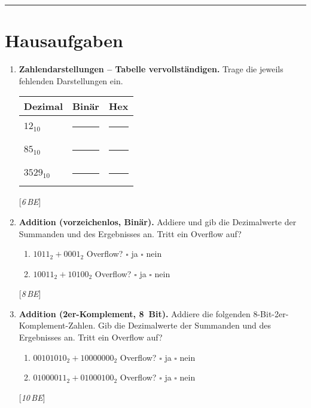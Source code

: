 \documentclass[11pt,a4paper]{scrartcl}
\newenvironment{aufgaben}{%
	\begin{enumerate}[leftmargin=*,label=\textbf{Aufgabe~\arabic*:}, itemsep=0.6em]
	}{\end{enumerate}}
\newcommand{\punkte}[1]{\hfill{\small[\textit{#1\,BE}]}}
\begin{document}
	\vspace{0.3em}
	\hrule
	\vspace{0.6em}
	
	\section*{Hausaufgaben}
	
	\begin{aufgaben}
		\item \textbf{Zahlendarstellungen – Tabelle vervollständigen.} Trage die jeweils fehlenden Darstellungen ein.
		\vspace{0.3em}
		
		\renewcommand{\arraystretch}{1.2}
		\begin{tabularx}{\linewidth}{|>{\raggedright\arraybackslash}X|>{\raggedright\arraybackslash}X|>{\raggedright\arraybackslash}X|}
			\hline
			\textbf{Dezimal} & \textbf{Binär} & \textbf{Hex} \\ \hline
			\(12_{10}\)  & \rule{4.5cm}{0.4pt} & \rule{3.0cm}{0.4pt} \\ \hline
			\(85_{10}\)  & \rule{4.5cm}{0.4pt} & \rule{3.0cm}{0.4pt} \\ \hline
			\(3529_{10}\)& \rule{4.5cm}{0.4pt} & \rule{3.0cm}{0.4pt} \\ \hline
		\end{tabularx}
		\punkte{6}
		
		\item \textbf{Addition (vorzeichenlos, Binär).} Addiere und gib die Dezimalwerte der Summanden und des Ergebnisses an. Tritt ein Overflow auf?
		\begin{enumerate}[label*=\alph*)]
			\item \(1011_2 + 0001_2\) \quad Overflow? \(\square\) ja \(\square\) nein
			\item \(10011_2 + 10100_2\) \quad Overflow? \(\square\) ja \(\square\) nein
		\end{enumerate}
		\punkte{8}
		
		\item \textbf{Addition (2er-Komplement, 8~Bit).} Addiere die folgenden 8-Bit-2er-Komplement-Zahlen. Gib die Dezimalwerte der Summanden und des Ergebnisses an. Tritt ein Overflow auf?
		\begin{enumerate}[label*=\alph*)]
			\item \(00101010_2 + 10000000_2\) \quad Overflow? \(\square\) ja \(\square\) nein
			\item \(01000011_2 + 01000100_2\) \quad Overflow? \(\square\) ja \(\square\) nein
		\end{enumerate}
		\punkte{10}
		

\end{aufgaben}
\end{document}
